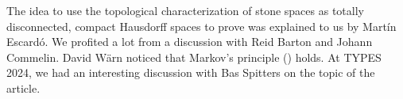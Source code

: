 The idea to use the topological characterization of stone spaces as totally disconnected, compact Hausdorff spaces to prove  was explained to us by Martín Escardó.
We profited a lot from a discussion with Reid Barton and Johann Commelin. 
David Wärn noticed that Markov's principle () holds. 
At TYPES 2024, we had an interesting discussion with Bas Spitters on the topic of the article.
